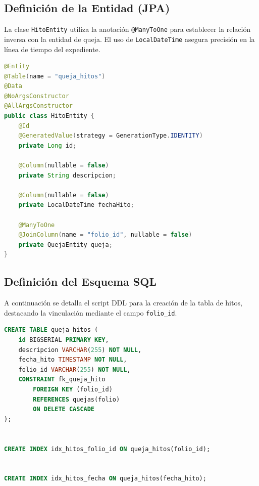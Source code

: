 \subsection{Definici\'on de la Entidad (JPA)}
La clase \texttt{HitoEntity} utiliza la anotaci\'on \texttt{@ManyToOne} para establecer la relaci\'on inversa con la entidad de queja. El uso de \texttt{LocalDateTime} asegura precisi\'on en la l\'inea de tiempo del expediente.

\begin{lstlisting}[language=Java, caption={Entidad Java para el registro de hitos de seguimiento.}, label={lst:java_hito}]
@Entity
@Table(name = "queja_hitos")
@Data
@NoArgsConstructor
@AllArgsConstructor
public class HitoEntity {
    @Id
    @GeneratedValue(strategy = GenerationType.IDENTITY)
    private Long id;

    @Column(nullable = false)
    private String descripcion; 
    
    @Column(nullable = false)
    private LocalDateTime fechaHito;

    @ManyToOne
    @JoinColumn(name = "folio_id", nullable = false)
    private QuejaEntity queja;
}
\end{lstlisting}

\subsection{Definici\'on del Esquema SQL}
A continuaci\'on se detalla el script DDL para la creaci\'on de la tabla de hitos, destacando la vinculaci\'on mediante el campo \texttt{folio\_id}.

\begin{lstlisting}[language=SQL, caption={Script de creaci\'on para la tabla de hitos de seguimiento.}, label={lst:sql_hitos}]
CREATE TABLE queja_hitos (
    id BIGSERIAL PRIMARY KEY,
    descripcion VARCHAR(255) NOT NULL,
    fecha_hito TIMESTAMP NOT NULL,
    folio_id VARCHAR(255) NOT NULL,
    CONSTRAINT fk_queja_hito 
        FOREIGN KEY (folio_id) 
        REFERENCES quejas(folio) 
        ON DELETE CASCADE
);


CREATE INDEX idx_hitos_folio_id ON queja_hitos(folio_id);


CREATE INDEX idx_hitos_fecha ON queja_hitos(fecha_hito);
\end{lstlisting}


